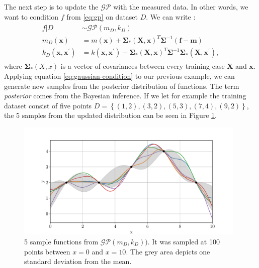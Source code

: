 The next step is to update the $\mathcal{GP}$ with the measured data. In other words, we want to condition $f$ from \ref{eq:gp} on dataset $D$. We can write \cite{rasmussen2004}:
\begin{align}
\begin{split}
	\label{eq:gaussian-condition}
	f \vert D & \sim\mathcal{GP}(m_D,k_D) \\
	m_D(\bm{x}) & = m(\bm{x}) + \bm{\Sigma_*(X,x)}^T \bm{\Sigma}^{-1} (\bm{f}-\bm{m}) \\
	k_D(\bm{x},\bm{x}^\prime) & = k(\bm{x},\bm{x}^\prime) - \bm{\Sigma_*(X,x)}^T \bm{\Sigma}^{-1} \bm{\Sigma_*(X,x^\prime)},
\end{split}
\end{align}
where $\bm{\Sigma_*}(X,x)$ is a vector of covariances between every training case $\bm{X}$ and $\bm{x}$. Applying equation \ref{eq:gaussian-condition} to our previous example, we can generate new samples from the posterior distribution of functions. The term \textit{posterior} comes from the Bayesian inference. If we let for example the training dataset consist of five points $D = \left\{(1,2),(3,2),(5,3),(7,4),(9,2)\right\}$, the 5 samples from the updated distribution can be seen in Figure \ref{fig:gaussian-samples-posterior}.
\begin{figure}[htb]
	\centering
	\includegraphics[width=0.98\textwidth]{figures/gaussian-samples-post}
	\caption{5 sample functions from $\mathcal{GP}(m_D,k_D))$. It was sampled at 100 points between $x = 0$ and $x=10$. The grey area depicts one standard deviation from the mean.}
	\label{fig:gaussian-samples-posterior}
\end{figure}

